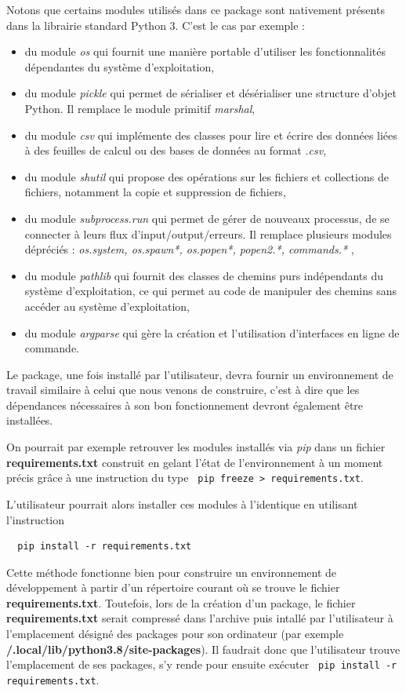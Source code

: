 \documentclass[twoside,a4paper,11pt,frenchb,openany]{report}
\begin{document}
Notons que certains modules utilisés dans ce package sont nativement présents dans la librairie standard Python 3. C'est le cas par exemple :
\begin{itemize}
\item du module \textit{os} qui fournit une manière portable d'utiliser les fonctionnalités dépendantes du système d'exploitation,
\item du module \textit{pickle} qui permet de sérialiser et désérialiser une structure d'objet Python. Il remplace le module primitif \textit{marshal},
\item du module \textit{csv} qui implémente des classes pour lire et écrire des données liées à des feuilles de calcul ou des bases de données au format \textit{.csv},
\item du module \textit{shutil} qui propose des opérations sur les fichiers et collections de fichiers, notamment la copie et suppression de fichiers,
\item du module \textit{subprocess.run} qui permet de gérer de nouveaux processus, de se connecter à leurs flux d'input/output/erreurs. Il remplace plusieurs modules dépréciés : \textit{os.system, os.spawn*, os.popen*, popen2.*, commands.* },
\item du module \textit{pathlib} qui fournit des classes de chemins purs indépendants du système d'exploitation, ce qui permet au code de manipuler des chemins sans accéder au système d'exploitation,
\item du module \textit{argparse} qui gère la création et l'utilisation d'interfaces en ligne de commande.
\end{itemize}

Le package, une fois installé par l'utilisateur, devra fournir un environnement de travail similaire à celui que nous venons de construire, c'est à dire que les dépendances nécessaires à son bon fonctionnement devront également être installées. 

On pourrait par exemple retrouver les modules installés via \textit{pip} dans un fichier \textbf{requirements.txt} construit en gelant l'état de l'environnement à un moment précis grâce à une instruction du type \texttt{  pip freeze > requirements.txt}.

L'utilisateur pourrait alors installer ces modules à l'identique en utilisant l'instruction
\begin{verbatim}  pip install -r requirements.txt\end{verbatim}

Cette méthode fonctionne bien pour construire un environnement de développement à partir d'un répertoire courant où se trouve le fichier \textbf{requirements.txt}. Toutefois, lors de la création d'un package, le fichier \textbf{requirements.txt} serait compressé dans l'archive puis intallé par l'utilisateur à l'emplacement désigné des packages pour son ordinateur (par exemple \textbf{/.local/lib/python3.8/site-packages}). Il faudrait donc que l'utilisateur trouve l'emplacement de ses packages, s'y rende pour ensuite exécuter \texttt{  pip install -r requirements.txt}. 
\end{document}
